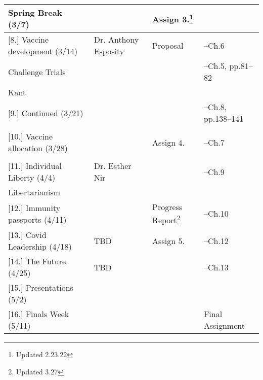 \documentclass[article,oneside]{memoir}
\begin{document}
\begin{landscape}
\begin{center}
\begin{longtable}{p{6cm}p{4cm}p{6cm}p{4cm}}
\textbf{Spring Break} (3/7) & &Assign 3.\footnote{Updated 2.23.22} & \\ [1.8\baselineskip]  \hline

 							

[8.] Vaccine development (3/14)	& Dr. Anthony Esposity		& Proposal				& --Ch.6 \\ 
Challenge Trials				& 	 		&						& --Ch.5, pp.81--82  \\ 
Kant							&			&						&    	\\ [1.8\baselineskip] \hline		

[9.] Continued	(3/21)			& 			& 						&  --Ch.8, pp.138--141\\ 
							&			&						&    	\\ [1.8\baselineskip] \hline	 

[10.] Vaccine allocation (3/28)		& 			& Assign 4.				& --Ch.7  \\
	    						&			&      						&  \\  [1.8\baselineskip] \hline


[11.] Individual Liberty (4/4)		&	Dr. Esther Nir	& 			& --Ch.9  \\ 
Libertarianism					 &			&						& 	 \\ [1.8\baselineskip] \hline				


[12.] Immunity passports  (4/11) 	& 			&  	Progress Report\footnote{Updated 3.27}		    			 & --Ch.10 \\ [1.8\baselineskip] \hline

[13.] Covid Leadership  (4/18) 		& TBD		&  Assign 5.    		  		 & --Ch.12   \\ [1.8\baselineskip] \hline


[14.] The Future  (4/25) 			& TBD		& 		     				 & --Ch.13   \\ [1.8\baselineskip] \hline


[15.] Presentations	(5/2)			& 			&						&  \\ [1.8\baselineskip] \hline

[16.] Finals Week (5/11)			&			&						 & Final Assignment \\ [1.8\baselineskip] \hline
	

\end{longtable}
\end{center}
\end{landscape}
\end{document}
